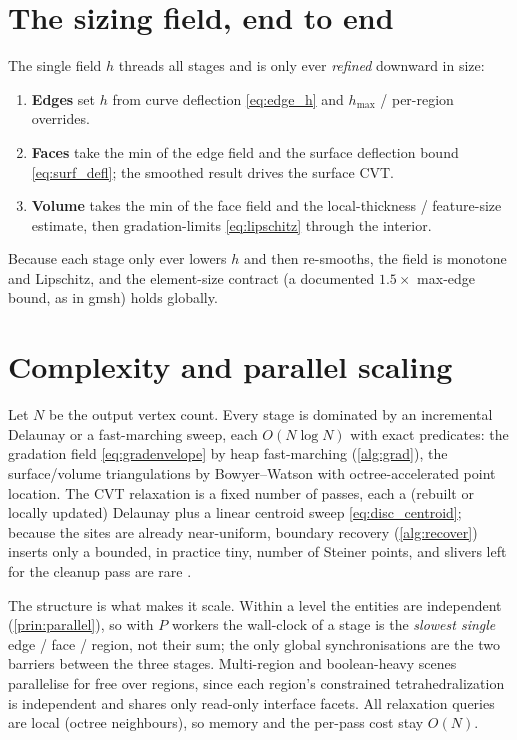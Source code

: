 \documentclass[11pt,a4paper]{article}
\numberwithin{equation}{section}
\begin{document}
\section{The sizing field, end to end}
The single field $h$ threads all stages and is only ever \emph{refined}
downward in size:
\begin{enumerate}[topsep=2pt,itemsep=1pt]
\item \textbf{Edges} set $h$ from curve deflection \eqref{eq:edge_h} and
$h_{\max}$ / per-region overrides.
\item \textbf{Faces} take the min of the edge field and the surface deflection
bound \eqref{eq:surf_defl}; the smoothed result drives the surface CVT.
\item \textbf{Volume} takes the min of the face field and the local-thickness /
feature-size estimate, then gradation-limits \eqref{eq:lipschitz} through the
interior.
\end{enumerate}
Because each stage only ever lowers $h$ and then re-smooths, the field is
monotone and Lipschitz, and the element-size contract (a documented
$1.5\times$ max-edge bound, as in gmsh) holds globally.

\section{Complexity and parallel scaling}
Let $N$ be the output vertex count. Every stage is dominated by an incremental
Delaunay or a fast-marching sweep, each $O(N\log N)$ with exact predicates: the
gradation field \eqref{eq:gradenvelope} by heap fast-marching (\cref{alg:grad}),
the surface/volume triangulations by Bowyer--Watson with octree-accelerated point
location. The CVT relaxation is a fixed number of passes, each a (rebuilt or
locally updated) Delaunay plus a linear centroid sweep \eqref{eq:disc_centroid};
because the sites are already near-uniform, boundary recovery (\cref{alg:recover})
inserts only a bounded, in practice tiny, number of Steiner points, and slivers
left for the cleanup pass are rare \cite{AlliezCohenSteiner2005,TournoisAlliez2009}.

The structure is what makes it scale. Within a level the entities are independent
(\cref{prin:parallel}), so with $P$ workers the wall-clock of a stage is the
\emph{slowest single} edge / face / region, not their sum; the only global
synchronisations are the two barriers between the three stages. Multi-region and
boolean-heavy scenes parallelise for free over regions, since each region's
constrained tetrahedralization is independent and shares only read-only interface
facets. All relaxation queries are local (octree neighbours), so memory and the
per-pass cost stay $O(N)$.
\end{document}
